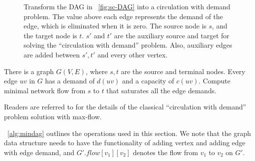 \begin{figure*}[h!]
    \caption{Transform the DAG in ~\ref{fig:sc-DAG} into a circulation with demand problem. 
    The value above each edge represents the demand of the edge, which is eliminated when it is zero.
    The source node is $s$, and the target node is $t$. $s'$ and $t'$ are the auxiliary source and target for solving the ``circulation with demand'' problem.
    Also, auxiliary edges are added between $s', t'$ and every other vertex.}
    \label{fig:sc-flow}
\end{figure*}


\begin{problem}
There is a graph $G(V,E)$, where $s,t$ are the source and terminal nodes. 
Every edge $uv$ in $G$ has a demand of $d(uv)$ and a capacity of $c(uv)$. 
Compute minimal network flow from $s$ to $t$ that saturates all the edge 
demands.
\end{problem}

Readers are referred to \cite{kleinberg2006algorithm} for %
the details of the classical ``circulation with demand'' problem solution with max-flow. 

~\ref{alg:mindag} outlines the operations
used in this section. We note that the 
graph data structure needs to have the functionality of adding vertex and adding 
edge with edge demand, and $G'.flow[v_1][v_2]$ denotes the flow from $v_1$ to $v_2$ on $G'$.


